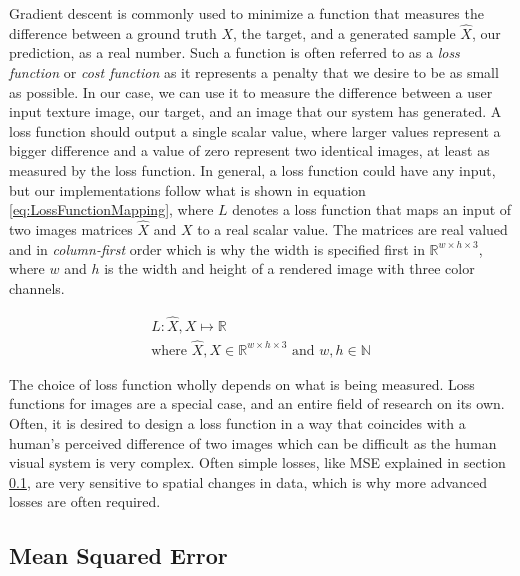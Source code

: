 Gradient descent is commonly used to minimize a function that measures the difference between a ground truth $X$, the target, and a generated sample $\hat{X}$, our prediction, as a real number. Such a function is often referred to as a \textit{loss function} or \textit{cost function} as it represents a penalty that we desire to be as small as possible. In our case, we can use it to measure the difference between a user input texture image, our target, and an image that our system has generated. A loss function should output a single scalar value, where larger values represent a bigger difference and a value of zero represent two identical images, at least as measured by the loss function. In general, a loss function could have any input, but our implementations follow what is shown in equation \ref{eq:LossFunctionMapping}, where $L$ denotes a loss function that maps an input of two images matrices $\hat{X}$ and $X$ to a real scalar value. The matrices are real valued and in \textit{column-first} order which is why the width is specified first in $\mathbb{R}^{w \times h \times 3}$, where $w$ and $h$ is the width and height of a rendered image with three color channels.

\begin{equation}
    \begin{aligned}
    L: \hat{X},X \mapsto \mathbb{R} \\
    \text{where } \hat{X}, X \in \mathbb{R}^{w\times h \times 3} \text{ and } w, h \in \mathbb{N}
    \end{aligned}
    \label{eq:LossFunctionMapping}
\end{equation}

The choice of loss function wholly depends on what is being measured. Loss functions for images are a special case, and an entire field of research on its own. Often, it is desired to design a loss function in a way that coincides with a human's perceived difference of two images which can be difficult as the human visual system is very complex. Often simple losses, like MSE explained in section \ref{sec:MeanSquaredError}, are very sensitive to spatial changes in data, which is why more advanced losses are often required.

\subsection{Mean Squared Error}\label{sec:MeanSquaredError}


